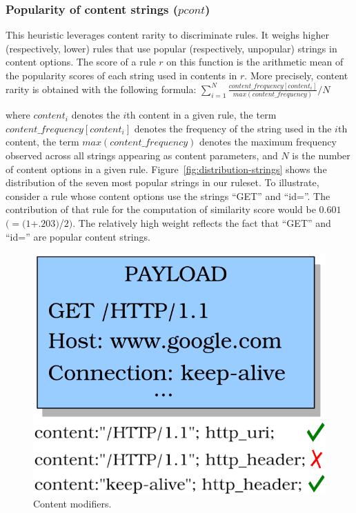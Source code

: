 \documentclass[conference]{IEEEtran}
\begin{document}

\subsubsection{Popularity of content strings ($pcont$)} 
This heuristic leverages content rarity to discriminate rules. It
weighs higher (respectively, lower) rules that use popular
(respectively, unpopular) strings in content options. The score of a
rule $r$ on this function is the arithmetic mean of the popularity
scores of each string used in contents in $r$. More precisely, content
rarity is obtained with the following formula:
\indent
$\sum_{i=1}^{N}\frac{\mathit{content\_frequency[content_i]}}{\mathit{max(content\_frequency)}}/N$

\noindent
where $\mathit{content_i}$ denotes the $i$th content in a given
rule, the term $\mathit{content\_frequency[\mathit{content_i}]}$
denotes the frequency of the string used in the $i$th content, the
term $\mathit{max(content\_frequency)}$ denotes the maximum frequency
observed across all strings appearing as content parameters, and $N$
is the number of content options in a given
rule. Figure~\ref{fig:distribution-strings} shows the distribution of
the seven most popular strings in our ruleset. To illustrate, consider a
rule whose content options use the strings ``GET'' and ``id=''. The
contribution of that rule for the computation of similarity score
would be $0.601$ $(=(1$+$.203)$/$2)$. The relatively high weight
reflects the fact that ``GET'' and ``id='' are popular content strings.

\begin{figure}
  \vspace{-2ex}
\centering
\includegraphics[scale=0.6]{figs/http_header-example.png}
\vspace{-1ex}
\caption{Content modifiers.}
\label{fig:http-header-example}
\end{figure}
\end{document}
